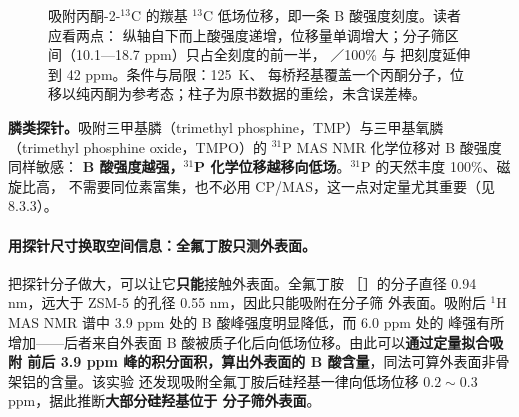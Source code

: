 \begin{figure}[htbp]
\centering
{}
\caption{吸附丙酮-2-$^{13}$C 的羰基 $^{13}$C 低场位移，即一条 B 酸强度刻度。读者应看两点：
纵轴自下而上酸强度递增，位移量单调增大；分子筛区间（10.1—18.7 ppm）只占全刻度的前一半，
／100\%  与  把刻度延伸到 42 ppm。条件与局限：\qty{125}{K}、
每桥羟基覆盖一个丙酮分子，位移以纯丙酮为参考态；柱子为原书数据的重绘，未含误差棒。
\redrawmark{}}
\label{fig:acetone-shift}
\end{figure}

\textbf{膦类探针。}吸附三甲基膦（trimethyl phosphine，TMP）与三甲基氧膦（trimethyl
phosphine oxide，TMPO）的 $^{31}$P MAS NMR 化学位移对 B 酸强度同样敏感：
\textbf{B 酸强度越强，$^{31}$P 化学位移越移向低场}。$^{31}$P 的天然丰度 100\%、磁旋比高，
不需要同位素富集，也不必用 CP/MAS，这一点对定量尤其重要（见 8.3.3）。

\paragraph{用探针尺寸换取空间信息：全氟丁胺只测外表面。}
把探针分子做大，可以让它\textbf{只能}接触外表面。全氟丁胺
［］的分子直径 0.94 nm，远大于 ZSM-5 的孔径 0.55 nm，因此只能吸附在分子筛
外表面。吸附后 $^{1}$H MAS NMR 谱中 3.9 ppm 处的 B 酸峰强度明显降低，而 6.0 ppm 处的
峰强有所增加——后者来自外表面 B 酸被质子化后向低场位移。由此可以\textbf{通过定量拟合吸附
前后 3.9 ppm 峰的积分面积，算出外表面的 B 酸含量}，同法可算外表面非骨架铝的含量。该实验
还发现吸附全氟丁胺后硅羟基一律向低场位移 $0.2\sim0.3$ ppm，据此推断\textbf{大部分硅羟基位于
分子筛外表面}。

